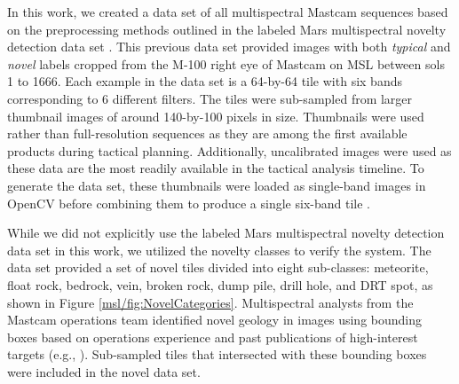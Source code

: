In this work, we created a data set of all multispectral Mastcam sequences based on the preprocessing methods outlined in the labeled Mars multispectral novelty detection data set \parencite{kerner_data}.
This previous data set provided images with both \textit{typical} and \textit{novel} labels cropped from the M-100 right eye of Mastcam on MSL between sols 1 to 1666.
Each example in the data set is a 64-by-64 tile with six bands corresponding to 6 different filters.
The tiles were sub-sampled from larger thumbnail images of around 140-by-100 pixels in size. 
Thumbnails were used rather than full-resolution sequences as they are among the first available products during tactical planning. 
Additionally, uncalibrated images were used as these data are the most readily available in the tactical analysis timeline. 
To generate the data set, these thumbnails were loaded as single-band images in OpenCV before combining them to produce a single six-band tile \parencite{opencv_library}.

While we did not explicitly use the labeled Mars multispectral novelty detection data set in this work, we utilized the novelty classes to verify the system.
The data set provided a set of novel tiles divided into eight sub-classes: meteorite, float rock, bedrock, vein, broken rock, dump pile, drill hole, and DRT spot, as shown in Figure \ref{msl/fig:NovelCategories}. 
Multispectral analysts from the Mastcam operations team identified novel geology in images using bounding boxes based on operations experience and past publications of high-interest targets (e.g., \cite{wellington2017visible}).
Sub-sampled tiles that intersected with these bounding boxes were included in the novel data set.

